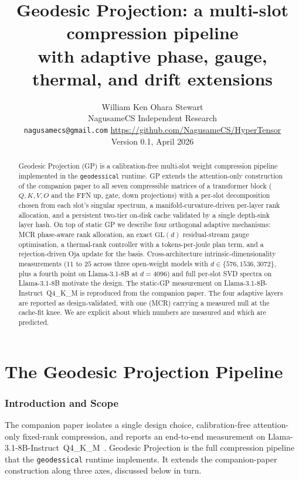 \documentclass[11pt]{article}
\title{Geodesic Projection: a multi-slot compression pipeline\\
with adaptive phase, gauge, thermal, and drift extensions}
\author{William Ken Ohara Stewart\\
\small NagusameCS Independent Research\\
\small \texttt{nagusamecs@gmail.com} \quad \url{https://github.com/NagusameCS/HyperTensor}\\
\small Version 0.1, April 2026}
\date{}
\begin{document}
\maketitle

\begin{abstract}
\noindent
Geodesic Projection (GP) is a calibration-free multi-slot weight
compression pipeline implemented in the \texttt{geodessical} runtime. GP
extends the attention-only construction of the companion paper to all
seven compressible matrices of a transformer block ($Q,K,V,O$ and the
FFN up, gate, down projections) with a per-slot decomposition chosen
from each slot's singular spectrum, a manifold-curvature-driven
per-layer rank allocation, and a persistent two-tier on-disk cache
validated by a single depth-sink layer hash. On top of static GP we
describe four orthogonal adaptive mechanisms: MCR phase-aware rank
allocation, an exact $\mathrm{GL}(d)$ residual-stream gauge
optimisation, a thermal-rank controller with a tokens-per-joule
plan term, and a rejection-driven Oja update for the basis. Cross-architecture
intrinsic-dimensionality measurements ($11$ to $25$ across three
open-weight models with $d\in\{576,1536,3072\}$, plus a fourth point
on Llama-3.1-8B at $d{=}4096$) and full per-slot SVD spectra on
Llama-3.1-8B motivate the design. The static-GP measurement on
Llama-3.1-8B-Instruct~Q4\_K\_M is reproduced from the companion paper.
The four adaptive layers are reported as design-validated, with one
(MCR) carrying a measured null at the cache-fit knee. We are explicit
about which numbers are measured and which are predicted.
\end{abstract}

\clearpage
\tableofcontents
\clearpage

\part{The Geodesic Projection Pipeline}

\section{Introduction and Scope}
The companion paper isolates a single design choice, calibration-free
attention-only fixed-rank compression, and reports an end-to-end
measurement on Llama-3.1-8B-Instruct~Q4\_K\_M~\cite{stewart2026grc}.
Geodesic Projection is the full compression pipeline that the
\texttt{geodessical} runtime implements. It extends the companion-paper
construction along three axes, discussed below in turn.
\end{document}
